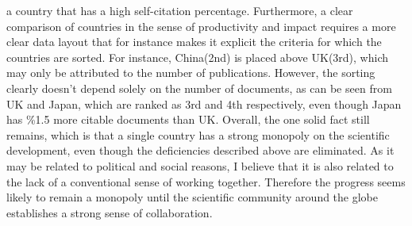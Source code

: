 \documentclass{article}
\begin{document}
a country that has a high self-citation percentage. Furthermore, a
clear comparison of countries in the sense of productivity and impact
requires a more clear data layout that for instance makes it explicit
the criteria for which the countries are sorted. For instance,
China(2nd) is placed above UK(3rd), which may only be attributed to
the number of publications. However, the sorting clearly doesn't
depend solely on the number of documents, as can be seen from UK and
Japan, which are ranked as 3rd and 4th respectively, even though Japan
has \%1.5 more citable documents than UK. Overall, the one solid fact
still remains, which is that a single country has a strong monopoly on
the scientific development, even though the deficiencies described
above are eliminated. As it may be related to political and social
reasons, I believe that it is also related to the lack of a
conventional sense of working together. Therefore the progress seems
likely to remain a monopoly until the scientific community around the
globe establishes a strong sense of collaboration.




\end{document}
